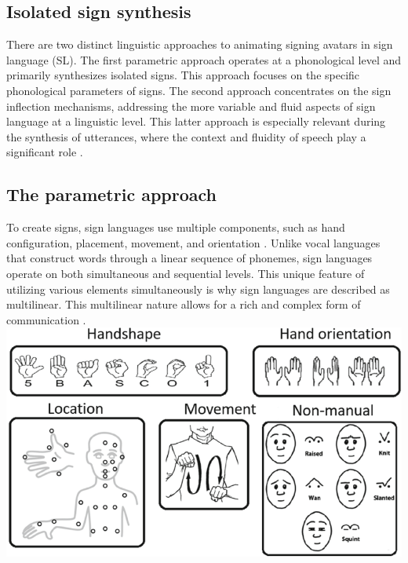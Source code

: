 \subsection{Isolated sign synthesis}

There are two distinct linguistic approaches to animating signing avatars in sign language (SL). The first parametric approach operates at a phonological level and primarily synthesizes isolated signs. This approach focuses on the specific phonological parameters of signs. The second approach concentrates on the sign inflection mechanisms, addressing the more variable and fluid aspects of sign language at a linguistic level. This latter approach is especially relevant during the synthesis of utterances, where the context and fluidity of speech play a significant role \parencite{naert2020survey}.

\subsection{The parametric approach}


To create signs, sign languages use multiple components, such as 
hand configuration, placement, movement, and orientation 
\parencite{naert2020survey}. Unlike vocal languages that construct 
words through a linear sequence of phonemes, sign languages operate 
on both simultaneous and sequential levels. This unique feature of 
utilizing various elements simultaneously is why sign languages are 
described as multilinear. This multilinear nature allows for a rich 
and complex form of communication 
\parencite{sallandre2007simultaneity}.\\

\includegraphics[width=\textwidth]{figures/signcomponents.png}


